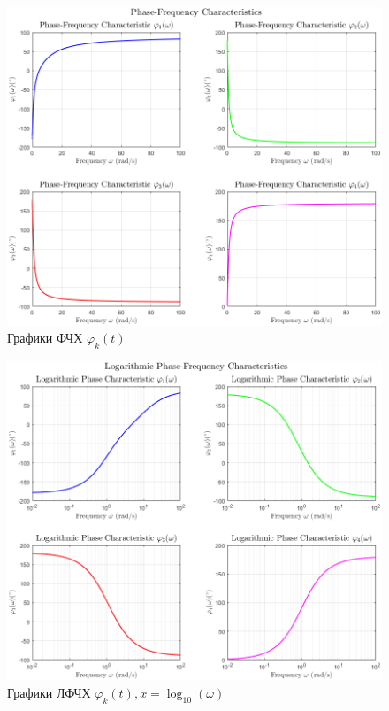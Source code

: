 \documentclass[a4paper, 12pt]{article}
\begin{document}
    \begin{figure}[H]
        \centering
        \includegraphics[scale=0.585]{1task_phii.png}
        \captionsetup{skip=0pt}
        \caption{Графики ФЧХ $\varphi_k(t)$}
        \label{fig:1task_phii}
    \end{figure}
    \begin{figure}[H]
        \centering
        \includegraphics[scale=0.585]{1task_lphii.png}
        \captionsetup{skip=0pt}
        \caption{Графики ЛФЧХ $\varphi_k(t),x=\log_{10}\left( \omega \right)$}
        \label{fig:1task_lphii}
    \end{figure}
\end{document}
